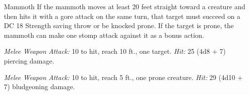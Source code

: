 \documentclass[10pt,a4paper,twoside,bg=print,twocolumn,openany,nodeprecatedcode]{dndbook}
\begin{document}
\begin{DndMonster}[float=t]{Mammoth}
\DndMonsterBasics[
armor-class = {13 (natural armor)},
hit-points = {\DndDice{11d12 + 55}},
speed = {40 ft.}
]
\DndMonsterAbilityScores[
 str = 24,
 dex = 9,
 con = 21,
 int = 3,
 wis = 11,
 cha = 6
]
\DndMonsterDetails[
challenge = 6,
]
If the mammoth moves at least 20 feet straight toward a creature and then hits it with a gore attack on the same turn, that target must succeed on a DC 18 Strength saving throw or be knocked prone. If the target is prone, the mammoth can make one stomp attack against it as a bonus action.

\textsl{Melee Weapon Attack:} 10 to hit, reach 10 ft., one target. \textsl{Hit:} 25 (4d8 + 7) piercing damage.

\textsl{Melee Weapon Attack:} 10 to hit, reach 5 ft., one prone creature. \textsl{Hit:} 29 (4d10 + 7) bludgeoning damage.

\end{DndMonster}
\end{document}
